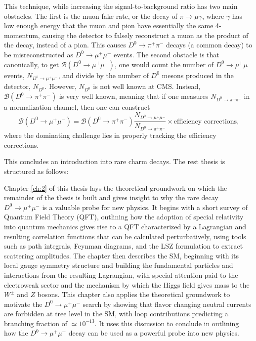 This technique, while increasing the signal-to-background ratio has two main obstacles. The first is the muon fake rate, or the decay of $\pi \to \mu \gamma$, where $\gamma$ has low enough energy that the muon and pion have essentially the same 4-momentum, causing the detector to falsely reconstruct a muon as the product of the decay, instead of a pion. This causes $D^0 \to \pi^+ \pi^-$ decays (a common decay) to be misreconstructed as $D^0 \to \mu^+ \mu^-$ events. The second obstacle is that canonically, to get $\mathcal{B}(D^0 \to \mu^+ \mu^-)$, one would count the number of $D^0 \to \mu^+ \mu^-$ events, $N_{D^0 \to \mu^+ \mu^-}$, and divide by the number of $D^0$ mesons produced in the detector, $N_{D^0}$. However, $N_{D^0}$ is not well known at CMS. Instead, $\mathcal{B}(D^0 \to \pi^+ \pi^-)$ is very well known, meaning that if one measures $N_{D^0 \to \pi^+ \pi^-}$ in a normalization channel, then one can construct
$$
\mathcal{B}(D^0 \to \mu^+ \mu^-) = \mathcal{B}(D^0 \to \pi^+ \pi^-) \frac{N_{D^0 \to \mu^+ \mu^-}}{N_{D^0 \to \pi^+ \pi^-}} \times \text{efficiency corrections,}
$$
where the dominating challenge lies in properly tracking the efficiency corrections.

\bigbreak

This concludes an introduction into rare charm decays. The rest thesis is structured as follows:

Chapter \ref{ch:2} of this thesis lays the theoretical groundwork on which the remainder of the thesis is built and gives insight to why the rare decay $D^0 \to \mu^+ \mu^-$ is a valuable probe for new physics. It begins with a short survey of Quantum Field Theory (QFT), outlining how the adoption of special relativity into quantum mechanics gives rise to a QFT characterized by a Lagrangian and resulting correlation functions that can be calculated perturbatively, using tools such as path integrals, Feynman diagrams, and the LSZ formulation to extract scattering amplitudes. The chapter then describes the SM, beginning with its local gauge symmetry structure and building the fundamental particles and interactions from the resulting Lagrangian, with special attention paid to the electroweak sector and the mechanism by which the Higgs field gives mass to the $W^\pm$ and $Z$ bosons. This chapter also applies the theoretical groundwork to motivate the $D^0 \to \mu^+ \mu^-$  search by showing that flavor changing neutral currents are forbidden at tree level in the SM, with loop contributions predicting a branching fraction of $\simeq 10^{-13}$. It uses this discussion to conclude in outlining how the $D^0 \to \mu^+ \mu^-$ decay can be used as a powerful probe into new physics. 

